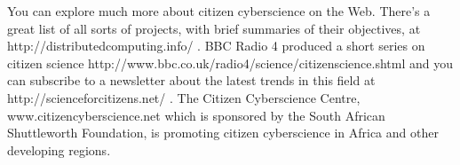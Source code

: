 You can explore much more about citizen cyberscience on the Web. There’s a great list of all sorts of projects, with brief summaries of their objectives, at http://distributedcomputing.info/ . BBC Radio 4 produced a short series on citizen science http://www.bbc.co.uk/radio4/science/citizenscience.shtml  and you can subscribe to a newsletter about the latest trends in this field at http://scienceforcitizens.net/  . The Citizen Cyberscience Centre, www.citizencyberscience.net  which is sponsored by the South African Shuttleworth Foundation, is promoting citizen cyberscience in Africa and other developing regions.